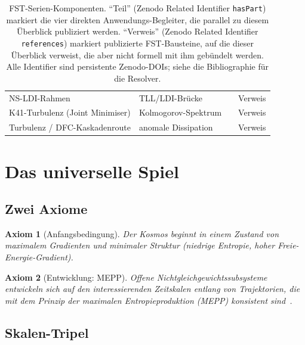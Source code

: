\documentclass[11pt,a4paper]{article}
\newtheorem{axiom}{Axiom}
\theoremstyle{remark}
\begin{document}
\begin{table}[h]
\begin{tabularx}{\textwidth}{p{3.0cm}Y p{2.3cm}p{1.8cm}}
NS-LDI-Rahmen                   & TLL/LDI-Brücke          & \cite{GeigerNSLDI-2026}      & Verweis \\
K41-Turbulenz (Joint Minimiser) & Kolmogorov-Spektrum     & \cite{GeigerK41-2026}        & Verweis \\
Turbulenz / DFC-Kaskadenroute   & anomale Dissipation     & \cite{GeigerTurbulence-2026} & Verweis \\
\bottomrule
\end{tabularx}
\endgroup
\caption{FST-Serien-Komponenten. ``Teil'' (Zenodo Related Identifier
\texttt{hasPart}) markiert die vier direkten Anwendungs-Begleiter, die
parallel zu diesem Überblick publiziert werden. ``Verweis'' (Zenodo Related Identifier
\texttt{references}) markiert publizierte FST-Bausteine, auf die dieser Überblick verweist, die aber
nicht formell mit ihm gebündelt werden. Alle Identifier sind persistente
Zenodo-DOIs; siehe die Bibliographie für die Resolver.}
\label{tab:series-components}
\end{table}

\section{Das universelle Spiel}
\label{sec:universal-game}

\subsection{Zwei Axiome}

\begin{axiom}[Anfangsbedingung]
Der Kosmos beginnt in einem Zustand von maximalem Gradienten und minimaler Struktur (niedrige Entropie, hoher Freie-Energie-Gradient).
\end{axiom}

\begin{axiom}[Entwicklung: MEPP]
Offene Nichtgleichgewichtssubsysteme entwickeln sich auf den interessierenden Zeitskalen entlang von Trajektorien, die mit dem Prinzip der maximalen Entropieproduktion (MEPP) konsistent sind~\cite{MartyushevSeleznev2006}.
\end{axiom}

\subsection{Skalen-Tripel}
\end{document}
